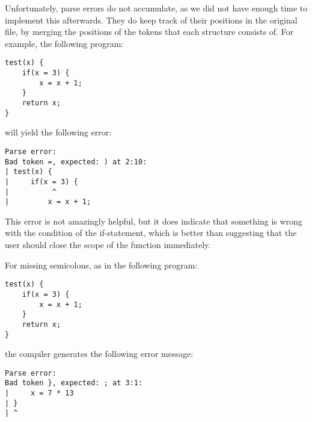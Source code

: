 Unfortunately, parse errors do not accumulate, as we did not have enough time to implement this afterwards. They do keep track of their positions in the original file, by merging the positions of the tokens that each structure consists of. For example, the following program:

\begin{lstlisting}
test(x) {
    if(x = 3) {
        x = x + 1;
    }
    return x;
}
\end{lstlisting}

will yield the following error:

\begin{lstlisting}[language={}]
Parse error:
Bad token =, expected: ) at 2:10:
| test(x) {
|     if(x = 3) {
|          ^
|         x = x + 1;
\end{lstlisting}

This error is not amazingly helpful, but it does indicate that something is wrong with the condition of the if-statement, which is better than suggesting that the user should close the scope of the function immediately.

For missing semicolons, as in the following program:

\begin{lstlisting}
test(x) {
    if(x = 3) {
        x = x + 1;
    }
    return x;
}
\end{lstlisting}

the compiler generates the following error message:

\begin{lstlisting}[language={}]
Parse error:
Bad token }, expected: ; at 3:1:
|     x = 7 * 13
| }
| ^
\end{lstlisting}

